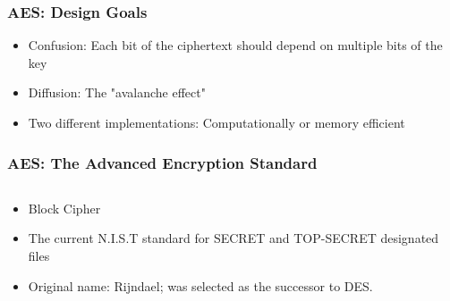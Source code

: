 \documentclass[12pt]{beamer}
\begin{document}
\begin{frame}
\frametitle{AES: Design Goals}
\begin{itemize}
\item<1-> Confusion: Each bit of the ciphertext should depend on multiple bits of the key
\item<2-> Diffusion: The "avalanche effect"
\item<3-> Two different implementations: Computationally or memory efficient
\end{itemize}
\end{frame}

\begin{frame}
\frametitle{AES: The Advanced Encryption Standard}
\begin{columns}
\begin{column}{0.5\textwidth}
\begin{itemize}
\item<2-> Block Cipher
\item<3-> The current N.I.S.T standard for SECRET and TOP-SECRET designated files
\item<4-> Original name: Rijndael; was selected as the successor to DES.
\end{itemize}
\end{column}
\begin{column}{0.5\textwidth}
\begin{center}
\end{center}
\end{column}
\end{columns}
\end{frame}
\end{document}

